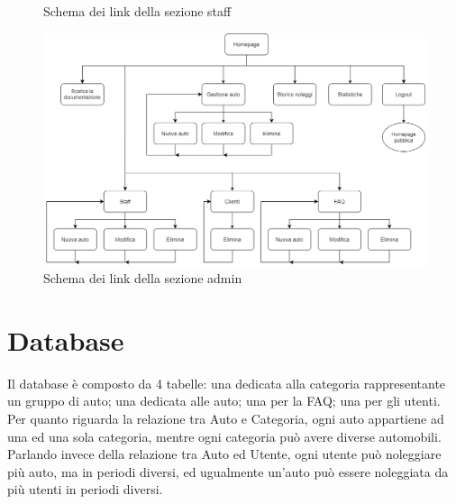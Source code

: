 \documentclass[12pt,a4paperS]{report}
\begin{document}
\begin{normalsize}
\begin{figure}[H]
					\newline
					\caption{Schema dei link della sezione staff}
				\end{figure}
				\begin{figure}[H]
					\centering
					\includegraphics[width=1.15\textwidth, height=1.15\textheight, trim=100 0 0 0,keepaspectratio]{Grafici/Link_sez_admin.png}
					\caption{Schema dei link della sezione admin}
				\end{figure}
				
			\section{Database}
				Il database è composto da 4 tabelle: una dedicata alla categoria rappresentante un gruppo di auto; una dedicata alle auto; una per la FAQ; una per gli utenti.
				\newline
				Per quanto riguarda la relazione tra Auto e Categoria, ogni auto appartiene ad una ed una sola categoria, mentre ogni categoria può avere diverse automobili.
				\newline
				Parlando invece della relazione tra Auto ed Utente, ogni utente può noleggiare più auto, ma in periodi diversi, ed ugualmente un'auto può essere noleggiata da più utenti in periodi diversi.

\end{normalsize}
\end{document}
